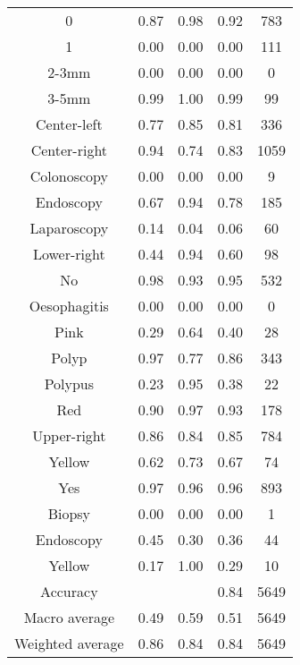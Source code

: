 \begin{center}
\begin{longtable}{|c|c|c|c|c|}
0 &   0.87 &  0.98 &  0.92 &   783 \\
1 &   0.00 &  0.00 &  0.00 &   111 \\
2-3mm &   0.00 &  0.00 &  0.00 &     0 \\
3-5mm &   0.99 &  1.00 &  0.99 &    99 \\
Center-left &   0.77 &  0.85 &  0.81 &   336 \\
Center-right &   0.94 &  0.74 &  0.83 &  1059 \\
Colonoscopy &   0.00 &  0.00 &  0.00 &     9 \\
Endoscopy &   0.67 &  0.94 &  0.78 &   185 \\
Laparoscopy &   0.14 &  0.04 &  0.06 &    60 \\
Lower-right &   0.44 &  0.94 &  0.60 &    98 \\
No &   0.98 &  0.93 &  0.95 &   532 \\
Oesophagitis &   0.00 &  0.00 &  0.00 &     0 \\
Pink &   0.29 &  0.64 &  0.40 &    28 \\
Polyp &   0.97 &  0.77 &  0.86 &   343 \\
Polypus &   0.23 &  0.95 &  0.38 &    22 \\
Red &   0.90 &  0.97 &  0.93 &   178 \\
Upper-right &   0.86 &  0.84 &  0.85 &   784 \\
Yellow &   0.62 &  0.73 &  0.67 &    74 \\
Yes &   0.97 &  0.96 &  0.96 &   893 \\
Biopsy &   0.00 &  0.00 &  0.00 &     1 \\
Endoscopy &   0.45 &  0.30 &  0.36 &    44 \\
Yellow &   0.17 &  1.00 &  0.29 &    10 \\
\hline
Accuracy &  &   &   0.84 &  5649 \\
Macro average &   0.49 &  0.59 &  0.51 &  5649 \\
Weighted average &   0.86 &  0.84 &  0.84 &  5649 \\
 

\end{longtable}
\end{center}